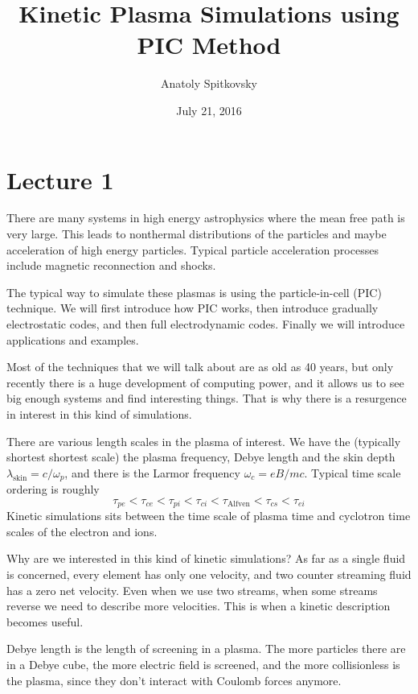 \documentclass[letterpaper, 11pt]{article}
\numberwithin{equation}{section}
\numberwithin{figure}{section}
\begin{document}
\title{Kinetic Plasma Simulations using PIC Method}
\author{Anatoly Spitkovsky}
\date{July 21, 2016}

\maketitle

\section{Lecture 1}

There are many systems in high energy astrophysics where the mean free path is
very large. This leads to nonthermal distributions of the particles and maybe
acceleration of high energy particles. Typical particle acceleration processes
include magnetic reconnection and shocks.

The typical way to simulate these plasmas is using the particle-in-cell (PIC)
technique. We will first introduce how PIC works, then introduce gradually
electrostatic codes, and then full electrodynamic codes. Finally we will
introduce applications and examples.

Most of the techniques that we will talk about are as old as 40 years, but only
recently there is a huge development of computing power, and it allows us to see
big enough systems and find interesting things. That is why there is a
resurgence in interest in this kind of simulations.

There are various length scales in the plasma of interest. We have the
(typically shortest shortest scale) the plasma frequency, Debye
length and the skin depth $\lambda_\mathrm{skin} = c/\omega_p$, and there is the
Larmor frequency $\omega_{c} = eB/mc$. Typical time scale ordering is roughly
\begin{equation}
  \label{eq:1}
  \tau_{pe} < \tau_{ce} < \tau_{pi} < \tau_{ci} < \tau_\mathrm{Alfven} < \tau_{cs} < \tau_{ei}
\end{equation}
Kinetic simulations sits between the time scale of plasma time and cyclotron
time scales of the electron and ions.

Why are we interested in this kind of kinetic simulations? As far as a single
fluid is concerned, every element has only one velocity, and two counter
streaming fluid has a zero net velocity. Even when we use two streams, when some
streams reverse we need to describe more velocities. This is when a kinetic
description becomes useful.

Debye length is the length of screening in a plasma. The more particles there
are in a Debye cube, the more electric field is screened, and the more
collisionless is the plasma, since they don't interact with Coulomb forces
anymore.
\end{document}
